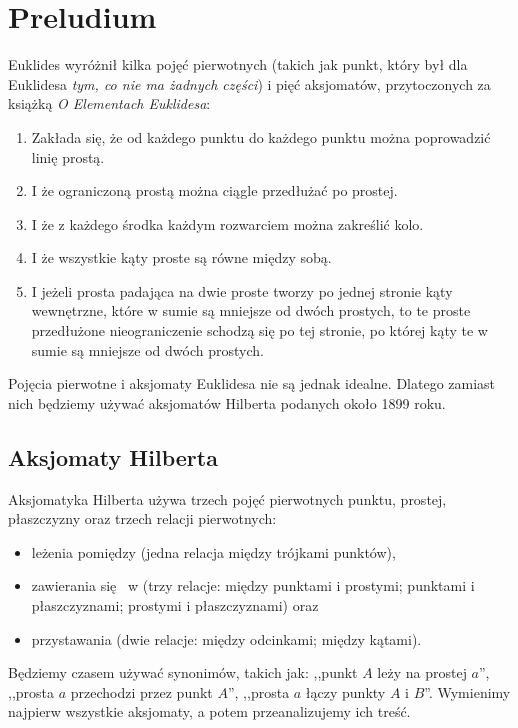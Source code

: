 \documentclass{parchment}
\begin{document}


\chapter{Preludium}

Euklides wyróżnił kilka pojęć pierwotnych (takich jak punkt, który był dla Euklidesa \emph{tym, co nie ma żadnych części}) i pięć aksjomatów, przytoczonych za książką \emph{O Elementach Euklidesa}:

\begin{enumerate}
	\item Zakłada się, że od każdego punktu do każdego punktu można poprowadzić linię prostą.
	\item I że ograniczoną prostą można ciągle przedłużać po prostej.
	\item I że z każdego środka każdym rozwarciem można zakreślić kolo.
	\item I że wszystkie kąty proste są równe między sobą.
	\item I jeżeli prosta padająca na dwie proste tworzy po jednej stronie kąty wewnętrzne, które w sumie są mniejsze od dwóch prostych, to te proste przedłużone nieograniczenie schodzą się po tej stronie, po której kąty te w sumie są mniejsze od dwóch prostych.
\end{enumerate}

Pojęcia pierwotne i aksjomaty Euklidesa nie są jednak idealne.
Dlatego zamiast nich będziemy używać aksjomatów Hilberta podanych około 1899 roku.

\section{Aksjomaty Hilberta}
Aksjomatyka Hilberta używa trzech pojęć pierwotnych punktu, prostej, płaszczyzny oraz trzech relacji pierwotnych:
\begin{itemize}
	\item leżenia pomiędzy (jedna relacja między trójkami punktów),
	\item zawierania się  w (trzy relacje: między punktami i prostymi; punktami i płaszczyznami; prostymi i płaszczyznami) oraz
	\item przystawania (dwie relacje: między odcinkami; między kątami).
\end{itemize}
Będziemy czasem używać synonimów, takich jak: ,,punkt $A$ leży na prostej $a$'', ,,prosta $a$ przechodzi przez punkt $A$'', ,,prosta $a$ łączy punkty $A$ i $B$''.
Wymienimy najpierw wszystkie aksjomaty, a potem przeanalizujemy ich treść.
\end{document}
